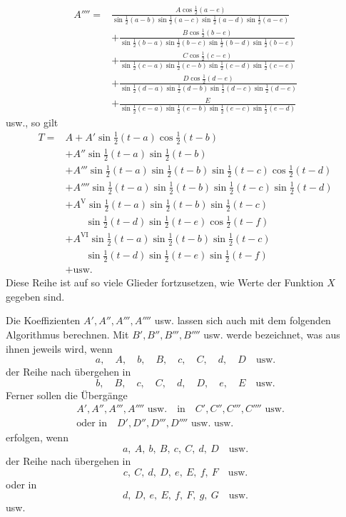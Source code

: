 \[\begin{aligned}
A''''={}&\frac{A\cos\tfrac12(a-e)}{\sin\tfrac12(a-b)\sin\tfrac12(a-c)\sin\tfrac12(a-d)\sin\tfrac12(a-e)}\\[5pt]
&+\frac{B\cos\tfrac12(b-e)}{\sin\tfrac12(b-a)\sin\tfrac12(b-c)\sin\tfrac12(b-d)\sin\tfrac12(b-e)}\\[5pt]
&+\frac{C\cos\tfrac12(c-e)}{\sin\tfrac12(c-a)\sin\tfrac12(c-b)\sin\tfrac12(c-d)\sin\tfrac12(c-e)}\\[5pt]
&+\frac{D\cos\tfrac12(d-e)}{\sin\tfrac12(d-a)\sin\tfrac12(d-b)\sin\tfrac12(d-c)\sin\tfrac12(d-e)}\\[5pt]
&+\frac{E}{\sin\tfrac12(e-a)\sin\tfrac12(e-b)\sin\tfrac12(e-c)\sin\tfrac12(e-d)}
\end{aligned}
\]
usw., so gilt
\[
\begin{aligned}
T={}&A+A'\sin\tfrac12(t-a)\cos\tfrac12(t-b)\\[5pt]
&+A''\sin\tfrac12(t-a)\sin\tfrac12(t-b)\\[5pt]
&+A'''\sin\tfrac12(t-a)\sin\tfrac12(t-b)\sin\tfrac12(t-c)\cos\tfrac12(t-d)\\[5pt]
&+A''''\sin\tfrac12(t-a)\sin\tfrac12(t-b)\sin\tfrac12(t-c)\sin\tfrac12(t-d)\\[5pt]
&+A^{\mathrm{V}}\sin\tfrac12(t-a)\sin\tfrac12(t-b)\sin\tfrac12(t-c)\\[5pt]&\qquad \sin\tfrac12(t-d)\sin\tfrac12(t-e)\cos\tfrac12(t-f)\\[5pt]
&+A^{\mathrm{VI}}\sin\tfrac12(t-a)\sin\tfrac12(t-b)\sin\tfrac12(t-c)\\[5pt]&\qquad \sin\tfrac12(t-d)\sin\tfrac12(t-e)\sin\tfrac12(t-f)\\[5pt]
&+\text{usw.}
\end{aligned}
\]
Diese Reihe ist auf so viele Glieder fortzusetzen, wie Werte der Funktion $X$
gegeben sind.

Die Koeffizienten $A',A'',A''',A''''$ usw. lassen sich auch mit dem folgenden Algorithmus berechnen.
Mit $B',B'',B''',B''''$ usw. werde bezeichnet, was aus ihnen jeweils wird, wenn
\[
a,\quad A,\quad b,\quad B,\quad c,\quad C,\quad d,\quad D\quad\text{usw.}
\]
der Reihe nach übergehen in
\[
b,\quad B,\quad c,\quad C,\quad d,\quad D,\quad e,\quad E\quad\text{usw.}
\]
Ferner sollen die Übergänge
\[\begin{gathered}
A',A'',A''',A''''\text{ usw.}\quad\text{in}\quad C',C'',C''',C''''\text{ usw.}\quad
\\[5pt]\text{oder in}\quad D',D'',D''',D''''\text{ usw. usw.}
\end{gathered}\]
erfolgen, wenn
\[
a,\ A,\ b,\ B,\ c,\ C,\ d,\ D\quad\text{usw.}
\]
der Reihe nach übergehen in
\[
c,\ C,\ d,\ D,\ e,\ E,\ f,\ F\quad\text{usw.}
\]
oder in
\[
d,\ D,\ e,\ E,\ f,\ F,\ g,\ G\quad\text{usw.}
\]
\hspace*{2em}usw.

